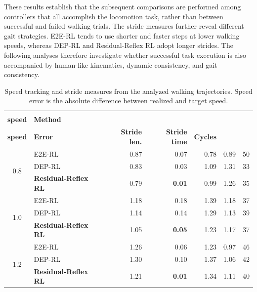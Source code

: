 \documentclass[manuscript,screen,review,anonymous]{acmart}
\begin{document}
These results establish that the subsequent comparisons are performed among controllers that all accomplish the locomotion task, rather than between successful and failed walking trials. The stride measures further reveal different gait strategies. E2E-RL tends to use shorter and faster steps at lower walking speeds, whereas DEP-RL and Residual-Reflex RL adopt longer strides. The following analyses therefore investigate whether successful task execution is also accompanied by human-like kinematics, dynamic consistency, and gait consistency.

\begin{table}[!t]
\centering
\caption{Speed tracking and stride measures from the analyzed walking
trajectories. Speed error is the absolute difference between realized and target
speed.}
\label{tab:spatiotemporal_metrics}
\small
\setlength{\tabcolsep}{3.5pt}
\renewcommand{\arraystretch}{1.12}
\begin{tabular}{c l r r r r r}
\toprule
\makecell{\textbf{Target}\\\textbf{speed}} & \textbf{Method} & \makecell{\textbf{Realized}\\\textbf{speed}} & \textbf{Error} & \textbf{Stride len.} & \textbf{Stride time} & \textbf{Cycles} \\
\midrule
\multirow[c]{3}{*}{0.8} & E2E-RL & 0.87 & 0.07 & 0.78 & 0.89 & 50 \\
 & DEP-RL & 0.83 & 0.03 & 1.09 & 1.31 & 33 \\
 & \textbf{Residual-Reflex RL} & 0.79 & \textbf{0.01} & 0.99 & 1.26 & 35 \\
\midrule
\multirow[c]{3}{*}{1.0} & E2E-RL & 1.18 & 0.18 & 1.39 & 1.18 & 37 \\
 & DEP-RL & 1.14 & 0.14 & 1.29 & 1.13 & 39 \\
 & \textbf{Residual-Reflex RL} & 1.05 & \textbf{0.05} & 1.23 & 1.17 & 37 \\
\midrule
\multirow[c]{3}{*}{1.2} & E2E-RL & 1.26 & 0.06 & 1.23 & 0.97 & 46 \\
 & DEP-RL & 1.30 & 0.10 & 1.37 & 1.06 & 42 \\
 & \textbf{Residual-Reflex RL} & 1.21 & \textbf{0.01} & 1.34 & 1.11 & 40 \\
\bottomrule
\end{tabular}
\end{table}
\end{document}
